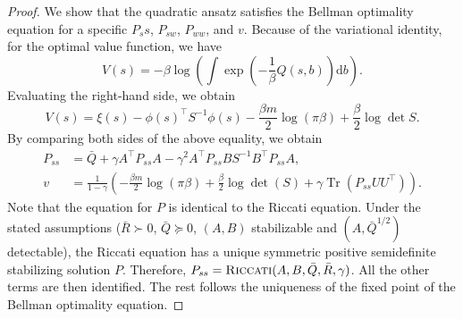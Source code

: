 \documentclass[letterpaper]{article} %
\DeclareMathOperator{\Tr}{Tr}     %
\providecommand{\rmd}{\mathrm{d}} %
\begin{document}
\begin{proof}
    We show that the quadratic ansatz satisfies the Bellman optimality equation for a specific $P_ss$, $P_{sw}$, $P_{ww}$, and $v$. 
    Because of the variational identity, for the optimal value function, we have
    \begin{equation}
    V(s) = - \beta \log \left( \int \exp \left( - \frac{1}{\beta} Q(s, b) \right) \rmd b\right) .
    \end{equation}
    Evaluating the right-hand side, we obtain 
    \begin{equation}
    V(s) = \xi(s) - \phi(s)^\top S^{-1} \phi(s) - \frac{\beta m}{2} \log(\pi \beta) + \frac{\beta}{2} \log \det S . 
    \end{equation}
    By comparing both sides of the above equality, we obtain
    \begin{align}
    P_{ss} &= \bar{Q} + \gamma A^\top P_{ss} A - \gamma^2 A^\top P_{ss} B S^{-1} B^\top P_{ss} A,\\
    v &= \frac{1}{1 - \gamma} \left( - \frac{\beta m}{2} \log(\pi \beta) +  \frac{\beta}{2} \log \det(S) + \gamma \Tr(P_{ss} UU^\top) \right).
    \end{align}
    Note that the equation for $P$ is identical to the Riccati equation. Under the stated assumptions ($\bar{R} \succ 0$, $\bar{Q} \succcurlyeq 0$, $(A, B)$ stabilizable and $(A, \bar{Q}^{1/2})$ detectable), the Riccati equation has a unique symmetric positive semidefinite stabilizing solution $P$. Therefore, $P_{ss} = \text{\textsc{Riccati}}(A, B, \bar{Q}, \bar{R}, \gamma)$. All the other terms are then identified. The rest follows the uniqueness of the fixed point of the Bellman optimality equation. 
\end{proof}
\end{document}
